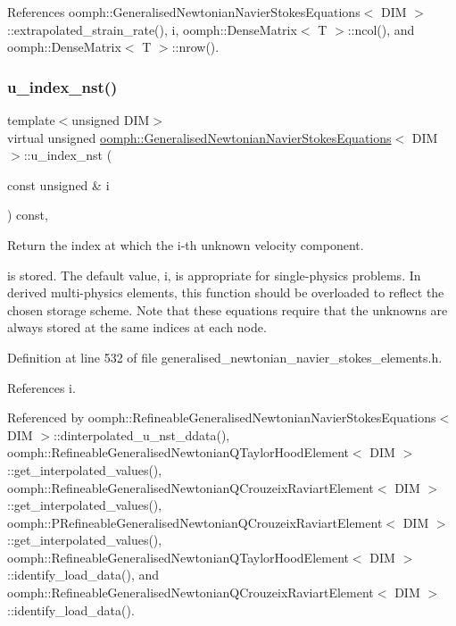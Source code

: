 References oomph\+::\+Generalised\+Newtonian\+Navier\+Stokes\+Equations$<$ D\+I\+M $>$\+::extrapolated\+\_\+strain\+\_\+rate(), i, oomph\+::\+Dense\+Matrix$<$ T $>$\+::ncol(), and oomph\+::\+Dense\+Matrix$<$ T $>$\+::nrow().

\mbox{\label{classoomph_1_1GeneralisedNewtonianNavierStokesEquations_a3d3e311b51c9258280c0f65d55581a3e}} 
\subsubsection{\texorpdfstring{u\+\_\+index\+\_\+nst()}{u\_index\_nst()}}
{\footnotesize\ttfamily template$<$unsigned D\+IM$>$ \\
virtual unsigned \hyperlink{classoomph_1_1GeneralisedNewtonianNavierStokesEquations}{oomph\+::\+Generalised\+Newtonian\+Navier\+Stokes\+Equations}$<$ D\+IM $>$\+::u\+\_\+index\+\_\+nst (\begin{DoxyParamCaption}\item[{const unsigned \&}]{i }\end{DoxyParamCaption}) const\hspace{0.3cm}{\ttfamily [inline]}, {\ttfamily [virtual]}}



Return the index at which the i-\/th unknown velocity component. 

is stored. The default value, i, is appropriate for single-\/physics problems. In derived multi-\/physics elements, this function should be overloaded to reflect the chosen storage scheme. Note that these equations require that the unknowns are always stored at the same indices at each node. 

Definition at line 532 of file generalised\+\_\+newtonian\+\_\+navier\+\_\+stokes\+\_\+elements.\+h.



References i.



Referenced by oomph\+::\+Refineable\+Generalised\+Newtonian\+Navier\+Stokes\+Equations$<$ D\+I\+M $>$\+::dinterpolated\+\_\+u\+\_\+nst\+\_\+ddata(), oomph\+::\+Refineable\+Generalised\+Newtonian\+Q\+Taylor\+Hood\+Element$<$ D\+I\+M $>$\+::get\+\_\+interpolated\+\_\+values(), oomph\+::\+Refineable\+Generalised\+Newtonian\+Q\+Crouzeix\+Raviart\+Element$<$ D\+I\+M $>$\+::get\+\_\+interpolated\+\_\+values(), oomph\+::\+P\+Refineable\+Generalised\+Newtonian\+Q\+Crouzeix\+Raviart\+Element$<$ D\+I\+M $>$\+::get\+\_\+interpolated\+\_\+values(), oomph\+::\+Refineable\+Generalised\+Newtonian\+Q\+Taylor\+Hood\+Element$<$ D\+I\+M $>$\+::identify\+\_\+load\+\_\+data(), and oomph\+::\+Refineable\+Generalised\+Newtonian\+Q\+Crouzeix\+Raviart\+Element$<$ D\+I\+M $>$\+::identify\+\_\+load\+\_\+data().

